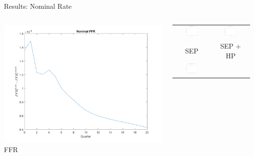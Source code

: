 \documentclass{beamer}
\begin{document}
\begin{frame}{Results: Nominal Rate}
\begin{columns}
  \centering
  \includegraphics[width=\textwidth]{figs/irf/nominal_ffr.png} \\
  FFR
  \begin{tabular}{cc}
  \includegraphics[width=0.45\textwidth]{figs/irf/nominal_implied_1.png} &
  \includegraphics[width=0.45\textwidth]{figs/irf/nominal_implied_2.png} \\
  SEP & SEP + HP \\
  \includegraphics[width=0.45\textwidth]{figs/irf/nominal_implied_3.png} &

\end{tabular}
\end{columns}
\end{frame}
\end{document}
